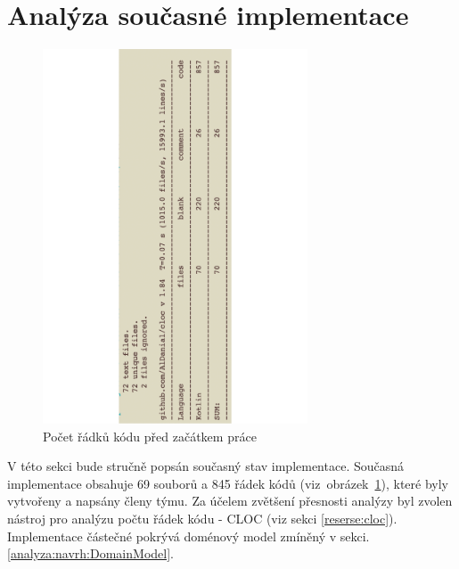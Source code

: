 \section{Analýza současné implementace}\label{analyza:soucasnaImplementace}
    \begin{figure}\centering
	   \includegraphics[angle=-90, width=0.7\textwidth]{pdfs/Cloc1}
	   \caption[Počet řádků kódu před začátkem práce]{Počet řádků kódu před začátkem práce}\label{image:cloc1}
    \end{figure}
     V této sekci bude stručně popsán současný stav implementace. Současná implementace obsahuje 69 souborů a 845 řádek kódů (viz~obrázek~\ref{image:cloc1}), které byly vytvořeny a napsány členy týmu. Za účelem zvětšení přesnosti analýzy byl zvolen nástroj pro analýzu počtu řádek kódu - CLOC (viz sekci \ref{reserse:cloc}). Implementace částečné pokrývá doménový model zmíněný v sekci. \ref{analyza:navrh:DomainModel}.
        
